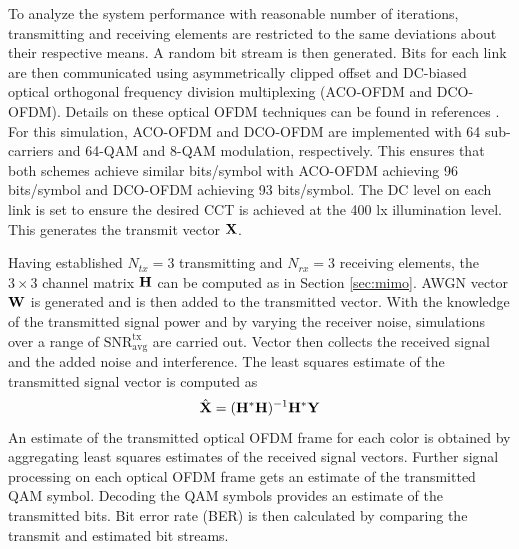 To analyze the system performance with reasonable number of iterations, transmitting and receiving elements are restricted to the same deviations about their respective means. A random bit stream is then generated. Bits for each link are then communicated using asymmetrically clipped offset and DC-biased optical orthogonal frequency division multiplexing (ACO-OFDM and DCO-OFDM). Details on these optical OFDM techniques can be found in references \cite{car96a,arm06a}. For this simulation, ACO-OFDM and DCO-OFDM are implemented with 64 sub-carriers and 64-QAM and 8-QAM modulation, respectively. This ensures that both schemes achieve similar bits/symbol with ACO-OFDM achieving 96 bits/symbol and DCO-OFDM achieving 93 bits/symbol. The DC level on each link is set to ensure the desired CCT is achieved at the 400 lx illumination level. This generates the transmit vector ${\bf{X}}$. 

Having established $N_{tx} = 3$ transmitting and $N_{rx} = 3$ receiving elements, the $3\times 3$ channel matrix ${\bf{H}}$ can be computed as in Section \ref{sec:mimo}. AWGN vector ${\bf{W}}$ is generated and is then added to the transmitted vector. With the knowledge of the transmitted signal power and by varying the receiver noise, simulations over a range of $\text{SNR}^{\text{tx}}_{\text{avg}}$ are carried out. Vector  then collects the received signal and the added noise and interference. The least squares estimate of the transmitted signal vector is computed as
\begin{equation}
	\label{eqXhat}
	\hat{{\bf{X}}} = ({\bf{H}}^{*}{\bf{H}})^{-1}{\bf{H}}^{*}{\bf{Y}}
\end{equation}
An estimate of the transmitted optical OFDM frame for each color is obtained by aggregating least squares estimates of the received signal vectors. Further signal processing on each optical OFDM frame gets an estimate of the transmitted QAM symbol. Decoding the QAM symbols provides an estimate of the transmitted bits. Bit error rate (BER) is then calculated by comparing the transmit and estimated bit streams.

